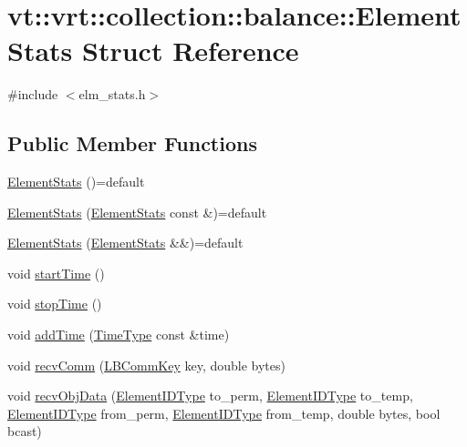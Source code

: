 \hypertarget{structvt_1_1vrt_1_1collection_1_1balance_1_1_element_stats}{}\section{vt\+:\+:vrt\+:\+:collection\+:\+:balance\+:\+:Element\+Stats Struct Reference}
\label{structvt_1_1vrt_1_1collection_1_1balance_1_1_element_stats}


{\ttfamily \#include $<$elm\+\_\+stats.\+h$>$}

\subsection*{Public Member Functions}
\begin{DoxyCompactItemize}
\item 
\hyperlink{structvt_1_1vrt_1_1collection_1_1balance_1_1_element_stats_a4d88e9b2f7981d7f98889fa9bea01d73}{Element\+Stats} ()=default
\item 
\hyperlink{structvt_1_1vrt_1_1collection_1_1balance_1_1_element_stats_a7d0f1ce4fdc1450c45da136137d11ece}{Element\+Stats} (\hyperlink{structvt_1_1vrt_1_1collection_1_1balance_1_1_element_stats}{Element\+Stats} const \&)=default
\item 
\hyperlink{structvt_1_1vrt_1_1collection_1_1balance_1_1_element_stats_ae99f86097df6e28374b3a0e7f8ef5b72}{Element\+Stats} (\hyperlink{structvt_1_1vrt_1_1collection_1_1balance_1_1_element_stats}{Element\+Stats} \&\&)=default
\item 
void \hyperlink{structvt_1_1vrt_1_1collection_1_1balance_1_1_element_stats_ad9489efefecb108cc677812f89475b9f}{start\+Time} ()
\item 
void \hyperlink{structvt_1_1vrt_1_1collection_1_1balance_1_1_element_stats_aca12581fe6da436d4d8dbd76776b7d8a}{stop\+Time} ()
\item 
void \hyperlink{structvt_1_1vrt_1_1collection_1_1balance_1_1_element_stats_aadebe326db328893e6a38413d647c9a1}{add\+Time} (\hyperlink{namespacevt_a876a9d0cd5a952859c72de8a46881442}{Time\+Type} const \&time)
\item 
void \hyperlink{structvt_1_1vrt_1_1collection_1_1balance_1_1_element_stats_af7d768dd4d2f62d09ab704262b292f91}{recv\+Comm} (\hyperlink{structvt_1_1vrt_1_1collection_1_1balance_1_1_l_b_comm_key}{L\+B\+Comm\+Key} key, double bytes)
\item 
void \hyperlink{structvt_1_1vrt_1_1collection_1_1balance_1_1_element_stats_afdd59d341ddd577a4652027b132a7c06}{recv\+Obj\+Data} (\hyperlink{namespacevt_1_1vrt_1_1collection_1_1balance_a14c8d2c972f2913aa3f1636e5be0a120}{Element\+I\+D\+Type} to\+\_\+perm, \hyperlink{namespacevt_1_1vrt_1_1collection_1_1balance_a14c8d2c972f2913aa3f1636e5be0a120}{Element\+I\+D\+Type} to\+\_\+temp, \hyperlink{namespacevt_1_1vrt_1_1collection_1_1balance_a14c8d2c972f2913aa3f1636e5be0a120}{Element\+I\+D\+Type} from\+\_\+perm, \hyperlink{namespacevt_1_1vrt_1_1collection_1_1balance_a14c8d2c972f2913aa3f1636e5be0a120}{Element\+I\+D\+Type} from\+\_\+temp, double bytes, bool bcast)

\end{DoxyCompactItemize}
